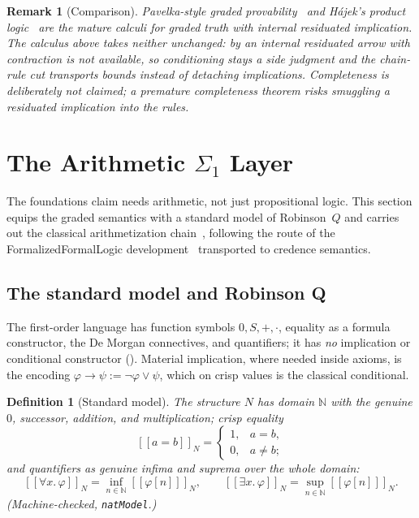 \documentclass[11pt,a4paper]{article}
\newtheorem{definition}[theorem]{Definition}
\newtheorem{remark}[theorem]{Remark}
\newcommand{\Nat}{\mathbb{N}}
\newcommand{\evalc}[2]{[\![ {#2} ]\!]_{#1}}
\begin{document}
\begin{remark}[Comparison]
Pavelka-style graded provability~\cite{pavelka1979i} and H\'ajek's
product logic~\cite{hajek1998} are the mature calculi for graded truth
with internal residuated implication.
The calculus above takes neither unchanged: by
 an internal residuated arrow with contraction
is not available, so conditioning stays a side judgment and the
chain-rule cut transports bounds instead of detaching implications.
Completeness is deliberately not claimed; a premature completeness
theorem risks smuggling a residuated implication into the rules.
\end{remark}

\section{The Arithmetic \texorpdfstring{$\Sigma_1$}{Sigma-1} Layer}
\label{sec:arith}

The foundations claim needs arithmetic, not just propositional logic.
This section equips the graded semantics with a standard model of
Robinson~$Q$ and carries out the classical arithmetization
chain~\cite{godel1931}, following the route of the
FormalizedFormalLogic development~\cite{fflfoundation} transported to
credence semantics.

\subsection{The standard model and Robinson Q}

The first-order language has function symbols $0, S, +, \cdot$,
equality as a formula constructor, the De Morgan connectives, and
quantifiers; it has \emph{no} implication or conditional constructor
().
Material implication, where needed inside axioms, is the encoding
$\varphi \to \psi := \neg\varphi \vee \psi$, which on crisp values is
the classical conditional.

\begin{definition}[Standard model]
\label{def:natmodel}
The structure $N$ has domain $\Nat$ with the genuine $0$, successor,
addition, and multiplication; crisp equality
\[
  \evalc{N}{a = b} =
  \begin{cases} 1, & a = b,\\ 0, & a \neq b; \end{cases}
\]
and quantifiers as genuine infima and suprema over the whole domain:
\[
  \evalc{N}{\forall x.\,\varphi} = \inf_{n \in \Nat}
    \evalc{N}{\varphi[n]},
  \qquad
  \evalc{N}{\exists x.\,\varphi} = \sup_{n \in \Nat}
    \evalc{N}{\varphi[n]}.
\]
(Machine-checked, \texttt{natModel}.)
\end{definition}
\end{document}
